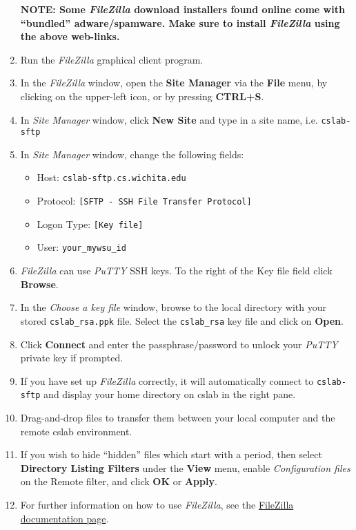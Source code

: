 \documentclass[12pt]{article}
\begin{document}
\begin{flushleft}
\begin{enumerate}
    {\bf NOTE: Some \textit{FileZilla} download installers found online come with ``bundled'' adware/spamware. Make sure to install \textit{FileZilla} using the above web-links.}

  \item Run the \textit{FileZilla} graphical client program.
  \item In the \textit{FileZilla} window, open the \textbf{Site Manager} via the \textbf{File} menu, by clicking on the upper-left icon, or by pressing \textbf{CTRL+S}.
  \item In \textit{Site Manager} window, click \textbf{New Site} and type in a site name, i.e. \verb|cslab-sftp|
  \newpage
  \item In \textit{Site Manager} window, change the following fields:
  \begin{itemize}
    \item Host: \verb|cslab-sftp.cs.wichita.edu|
    \item Protocol: \verb|[SFTP - SSH File Transfer Protocol]|
    \item Logon Type: \verb|[Key file]|
    \item User: \verb|your_mywsu_id|
  \end{itemize}
  \item \textit{FileZilla} can use \textit{PuTTY} SSH keys. To the right of the Key file field click \textbf{Browse}.
  \item In the \textit{Choose a key file} window, browse to the local directory with your stored \verb|cslab_rsa.ppk| file. Select the \texttt{cslab\_rsa} key file and click on \textbf{Open}.
  \item Click \textbf{Connect} and enter the passphrase/password to unlock your \textit{PuTTY} private key if prompted.
  \item If you have set up \textit{FileZilla} correctly, it will automatically connect to \verb|cslab-sftp| and display your home directory on cslab in the right pane.
  \item Drag-and-drop files to transfer them between your local computer and the remote cslab environment.
  \item If you wish to hide ``hidden'' files which start with a period, then select \textbf{Directory Listing Filters} under the \textbf{View} menu, enable \textit{Configuration files} on the Remote filter, and click \textbf{OK} or \textbf{Apply}.
  \item For further information on how to use \textit{FileZilla}, see the \href{https://wiki.filezilla-project.org/Documentation}{FileZilla documentation page}.
\end{enumerate}


\end{flushleft}
\end{document}
